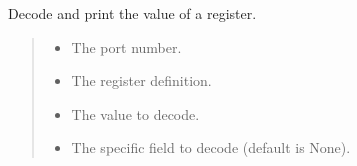 \documentclass[letterpaper,10pt,english]{sphinxmanual}
\begin{document}
\begin{fulllineitems}
\label{\detokenize{cplddocs:phy_marvell_88X2222_init.decode_register}}
\pysigstartsignatures
{}
\pysigstopsignatures
\sphinxAtStartPar
Decode and print the value of a register.
\begin{quote}\begin{description}
\begin{itemize}
\item {} 
\sphinxAtStartPar
{} \textendash{} The port number.

\item {} 
\sphinxAtStartPar
{} \textendash{} The register definition.

\item {} 
\sphinxAtStartPar
{} \textendash{} The value to decode.

\item {} 
\sphinxAtStartPar
{} \textendash{} The specific field to decode (default is None).

\end{itemize}

\end{description}\end{quote}

\end{fulllineitems}

\end{document}
